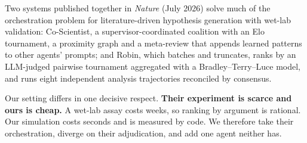 \documentclass[11pt]{article}
\begin{document}
Two systems published together in \emph{Nature} (July 2026) solve much of the orchestration
problem for literature-driven hypothesis generation with wet-lab validation: Co-Scientist, a
supervisor-coordinated coalition with an Elo tournament, a proximity graph and a meta-review that
appends learned patterns to other agents' prompts; and Robin, which batches and truncates,
ranks by an LLM-judged pairwise tournament aggregated with a Bradley--Terry--Luce model, and runs
eight independent analysis trajectories reconciled by consensus.

Our setting differs in one decisive respect. \textbf{Their experiment is scarce and ours is
cheap.} A wet-lab assay costs weeks, so ranking by argument is rational. Our simulation costs
seconds and is measured by code. We therefore take their orchestration, diverge on their
adjudication, and add one agent neither has.
\end{document}
